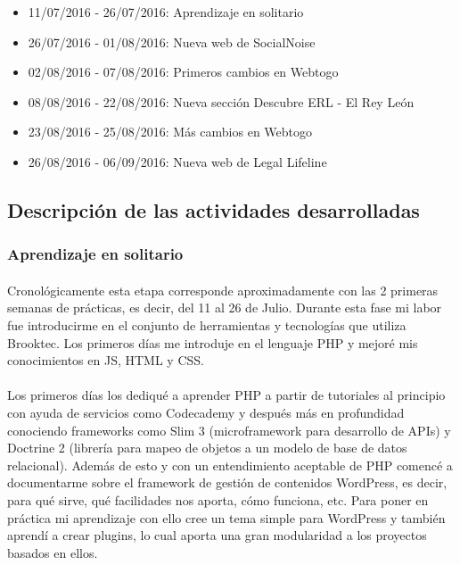 \documentclass[11pt, a4paper,spanish]{article}
\begin{document}
            \begin{itemize}
                \item 11/07/2016 - 26/07/2016:  Aprendizaje en solitario
                \item 26/07/2016 - 01/08/2016:  Nueva web de SocialNoise
                \item 02/08/2016 - 07/08/2016:  Primeros cambios en Webtogo
                \item 08/08/2016 - 22/08/2016:  Nueva sección Descubre ERL - El Rey León
                \item 23/08/2016 - 25/08/2016:  Más cambios en Webtogo
                \item 26/08/2016 - 06/09/2016:  Nueva web de Legal Lifeline
            \end{itemize}

        \subsection{Descripción de las actividades desarrolladas}

            \subsubsection{Aprendizaje en solitario}

                \paragraph{}
                Cronológicamente esta etapa corresponde aproximadamente con las 2 primeras semanas de prácticas, es decir, del 11 al 26 de Julio. Durante esta fase mi labor fue introducirme en el conjunto de herramientas y tecnologías que utiliza Brooktec. Los primeros días me introduje en el lenguaje PHP y mejoré mis conocimientos en JS, HTML y CSS.

                \paragraph{}
                Los primeros días los dediqué a aprender PHP a partir de tutoriales al principio con ayuda de servicios como Codecademy y después más en profundidad conociendo frameworks como Slim 3 (microframework para desarrollo de APIs) y Doctrine 2 (librería para mapeo de objetos a un modelo de base de datos relacional). Además de esto y con un entendimiento aceptable de PHP comencé a documentarme sobre el framework de gestión de contenidos WordPress, es decir, para qué sirve, qué facilidades nos aporta, cómo funciona, etc. Para poner en práctica mi aprendizaje con ello cree un tema simple para WordPress y también aprendí a crear plugins, lo cual aporta una gran modularidad a los proyectos basados en ellos.
\end{document}
